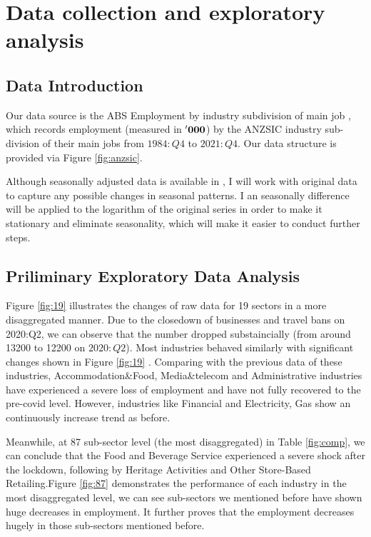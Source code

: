 \documentclass[11pt,a4paper,]{article}
\begin{document}
\hypertarget{data-collection-and-exploratory-analysis}{%
\section{Data collection and exploratory analysis}\label{data-collection-and-exploratory-analysis}}

\hypertarget{data-introduction}{%
\subsection{Data Introduction}\label{data-introduction}}

Our data source is the ABS Employment by industry subdivision of main job \autocite{ABS2022}, which records employment (measured in \(\bf{'000}\)) by the ANZSIC industry sub-division of their main jobs from \(1984:Q4\) to \(2021:Q4\). Our data structure is provided via Figure \ref{fig:anzsic}.

Although seasonally adjusted data is available in \autocite{ABS2022}, I will work with original data to capture any possible changes in seasonal patterns. I an seasonally difference will be applied to the logarithm of the original series in order to make it stationary and eliminate seasonality, which will make it easier to conduct further steps.

\hypertarget{priliminary-exploratory-data-analysis}{%
\subsection{Priliminary Exploratory Data Analysis}\label{priliminary-exploratory-data-analysis}}

\newpage

Figure \ref{fig:19} illustrates the changes of raw data for 19 sectors in a more disaggregated manner. Due to the closedown of businesses and travel bans on 2020:Q2, we can observe that the number dropped substaincially (from around 13200 to 12200 on \(2020:Q2\)). Most industries behaved similarly with significant changes shown in Figure \ref{fig:19} . Comparing with the previous data of these industries, Accommodation\&Food, Media\&telecom and Administrative industries have experienced a severe loss of employment and have not fully recovered to the pre-covid level. However, industries like Financial and Electricity, Gas show an continuously increase trend as before.

Meanwhile, at 87 sub-sector level (the most disaggregated) in Table \ref{fig:comp}, we can conclude that the Food and Beverage Service experienced a severe shock after the lockdown, following by Heritage Activities and Other Store-Based Retailing.Figure \ref{fig:87} demonstrates the performance of each industry in the most disaggregated level, we can see sub-sectors we mentioned before have shown huge decreases in employment. It further proves that the employment decreases hugely in those sub-sectors mentioned before.
\end{document}
